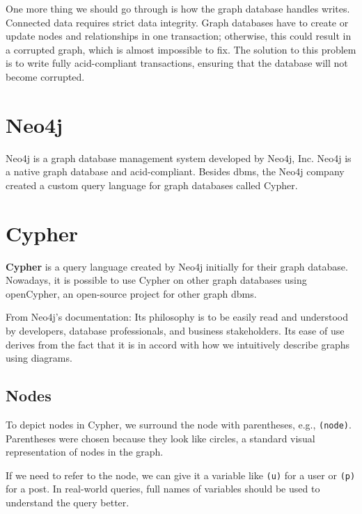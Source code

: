 One more thing we should go through is how the graph database handles writes. Connected data requires strict data integrity.
Graph databases have to create or update nodes and relationships in one transaction; otherwise, this could result in a corrupted graph, which is almost impossible to fix.
The solution to this problem is to write fully \acrshort{acid}-compliant transactions, ensuring that the database will not become corrupted.
\cite{chao_graph_2018}

\section{Neo4j}

Neo4j is a graph database management system developed by Neo4j, Inc. \cite{noauthor_company_nodate}
Neo4j is a native graph database and \acrshort{acid}-compliant.
Besides \acrshort{dbms}, the Neo4j company created a custom query language for graph databases called Cypher. \cite{noauthor_neo4j_nodate-2}

\section{Cypher}

\textbf{Cypher} is a query language created by Neo4j initially for their graph database.
Nowadays, it is possible to use Cypher on other graph databases using openCypher, an open-source project for other graph \acrshort{dbms}. \cite{noauthor_resources_nodate}

From Neo4j's documentation: Its philosophy is to be easily read and understood by developers, database professionals, and business stakeholders.
Its ease of use derives from the fact that it is in accord with how we intuitively describe graphs using diagrams. \cite{robinson_graph_2015}

\subsection{Nodes}

To depict nodes in Cypher, we surround the node with parentheses, e.g., \texttt{(node)}.
Parentheses were chosen because they look like circles, a standard visual representation of nodes in the graph. \cite{noauthor_getting_nodate}

If we need to refer to the node, we can give it a variable like \texttt{(u)} for a user or \texttt{(p)} for a post.
In real-world queries, full names of variables should be used to understand the query better.


